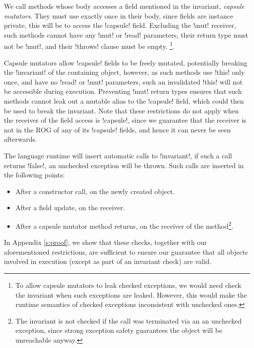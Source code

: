 We call \Q@mut@ methods whose body accesses a \Q@capsule@ field mentioned in the invariant, \emph{capsule mutators}.  
They must use \Q@this@ exactly once in their body, since fields are instance private, this will be to access the \Q!capsule! field.
Excluding the \Q!mut! receiver, such methods cannot have any \Q!mut! or \Q!read! parameters, their return type must not be \Q!mut!, and their \Q!throws! clause must be empty.%
\footnote{%
To allow capsule mutators to leak checked exceptions,
we would need check the invariant
when such exceptions are leaked. However, this would make the runtime semantics of checked exceptions inconsistent with unchecked ones.}.

Capsule mutators allow \Q!capsule! fields to be freely mutated, potentially breaking the \Q!invariant! of the containing object, however, as such methods use \Q!this!
only once, and have no \Q!read! or \Q!mut! parameters, such an invalidated \Q!this! will not be accessible during execution.
Preventing \Q!mut! return types ensures that such methods cannot leak out a mutable alias to the \Q!capsule! field, which could then be used to break the invariant.
Note that these restrictions do not apply when the receiver of the field access is \Q!capsule!, since we guarantee that the receiver is not in the ROG of any of its \Q!capsule! fields, and hence it can never be seen afterwards.

The language runtime will insert automatic calls to \Q!invariant!, if such a call returns \Q!false!, an unchecked exception will be thrown. Such calls are inserted in the following points:
\begin{itemize}
	\item After a constructor call, on the newly created object.
	\item After a field update, on the receiver.
	\item After a capsule mutator method returns, on the receiver of the method\footnote{The invariant is not checked if the call was terminated via an an unchecked exception, since strong exception safety guarantees the object will be unreachable anyway.}.
\end{itemize}
In Appendix \ref{s:proof}, we show that these checks, together with our aforementioned restrictions, are sufficient to ensure our guarantee that all objects involved in execution (except as part of an invariant check) are valid.

